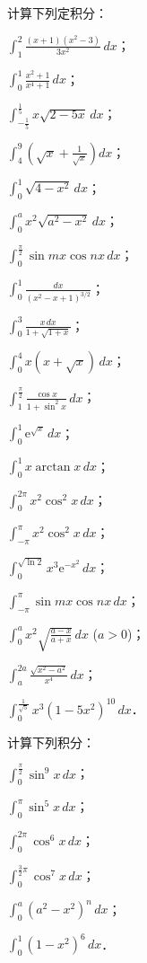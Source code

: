 \begin{xiti}
\item 计算下列定积分：
\begin{ziti}
\item $\displaystyle \int_1^2 \frac{(x+1)(x^2-3)}{3x^2}\,dx$；
\item $\displaystyle \int_0^1 \frac{x^2+1}{x^4+1}\,dx$；
\item $\displaystyle \int_{-\frac{1}{5}}^{\frac{1}{5}} x\sqrt{2 - 5x}\,dx$；
\item $\displaystyle \int_4^9 \left(\sqrt{x} + \frac{1}{\sqrt{x}}\right)dx$；
\item $\displaystyle \int_0^1 \sqrt{4 - x^2}\,dx$；
\item $\displaystyle \int_0^a x^2 \sqrt{a^2 - x^2}\,dx$；
\item $\displaystyle \int_0^{\frac{\pi}{2}}\sin mx\cos nx\,dx$；
\item $\displaystyle \int_0^1 \frac{dx}{(x^2 - x + 1)^{3/2}}$；
\item $\displaystyle \int_0^3 \frac{x\,dx}{1 + \sqrt{1 + x}}$；
\item $\displaystyle \int_0^4 x(x + \sqrt{x})\,dx$；
\item $\displaystyle \int_1^{\frac{\pi}{2}}\frac{\cos x}{1 + \sin^2 x}\,dx$；
\item $\displaystyle \int_0^1 \mathrm{e}^{\sqrt{x}}\,dx$；
\item $\displaystyle \int_0^1 x\arctan x\,dx$；
\item $\displaystyle \int_0^{2\pi} x^2 \cos^2 x\,dx$；
\item $\displaystyle \int_{-\pi}^\pi x^2 \cos^2 x\,dx$；
\item $\displaystyle \int_0^{\sqrt{\ln 2}} x^3 \mathrm{e}^{-x^2}\,dx$；
\item $\displaystyle \int_{-\pi}^\pi \sin mx\cos nx\,dx$；
\item $\displaystyle \int_0^a x^2 \sqrt{\frac{a - x}{a + x}}\,dx$ ($a > 0$)；
\item $\displaystyle \int_a^{2a}\frac{\sqrt{x^2 - a^2}}{x^4}\,dx$；
\item $\displaystyle \int_0^{\frac{1}{\sqrt{5}}} x^3(1 - 5x^2)^{10}\,dx$．
\end{ziti}

\item 计算下列积分：
\begin{ziti}
\item $\displaystyle \int_0^{\frac{\pi}{2}}\sin^9 x\,dx$；
\item $\displaystyle \int_0^\pi \sin^5 x\,dx$；
\item $\displaystyle \int_0^{2\pi}\cos^6 x\,dx$；
\item $\displaystyle \int_0^{\frac{3}{2}\pi}\cos^7 x\,dx$；
\item $\displaystyle \int_0^a (a^2 - x^2)^n\,dx$；
\item $\displaystyle \int_0^1 (1 - x^2)^6\,dx$．
\end{ziti}


\end{xiti}
